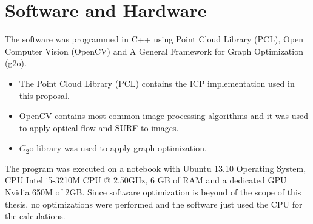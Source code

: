 \section{Software and Hardware}

The software \cite{SourceCode} was programmed in C++ using Point Cloud Library (PCL), Open Computer Vision (OpenCV) and 
A General Framework for Graph Optimization (g2o).

\begin{itemize}

\item The Point Cloud Library (PCL) \cite{pcl} contains the ICP implementation used in this proposal.

\item OpenCV \cite{opencv} contains most common image processing algorithms and it was used to apply 
optical flow and SURF to images. 

\item $G_2$o library \cite{g2o}  was used to apply graph optimization.

\end{itemize}

The program was executed on a notebook with Ubuntu 13.10 Operating System, 
CPU Intel i5-3210M CPU @ 2.50GHz, 6 GB of RAM 
and a dedicated GPU Nvidia 650M of 2GB. Since software optimization is beyond of the scope 
of this thesis, no optimizations were performed and the software just used the CPU for the calculations.

